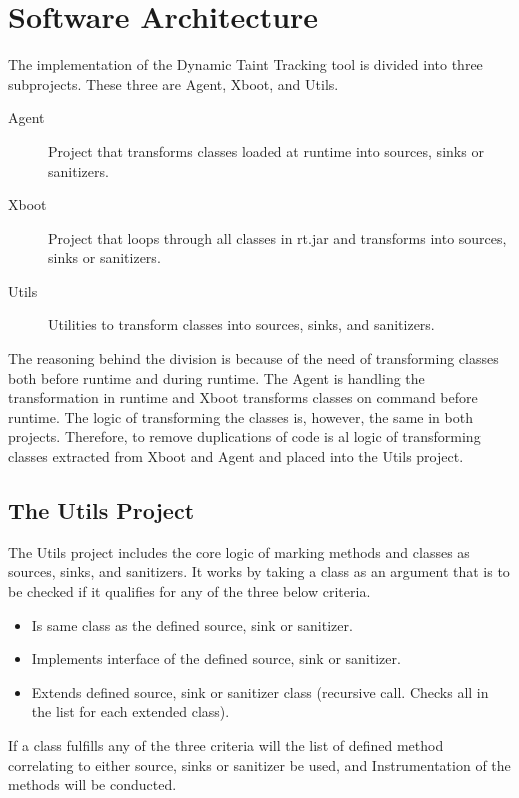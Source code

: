\section{Software Architecture}
\label{SoftwareArchitecture}
The implementation of the Dynamic Taint Tracking tool is divided into three subprojects. These three are Agent, Xboot, and Utils. 

\hfill
\begin{description}
    \item[Agent] Project that transforms classes loaded at runtime into sources, sinks or sanitizers.
    \item[Xboot] Project that loops through all classes in rt.jar and transforms into sources, sinks or sanitizers.
    \item[Utils] Utilities to transform classes into sources, sinks, and sanitizers. 
\end{description}
\hfill

The reasoning behind the division is because of the need of transforming classes both before runtime and during runtime. The Agent is handling the transformation in runtime and Xboot transforms classes on command before runtime. The logic of transforming the classes is, however, the same in both projects. Therefore, to remove duplications of code is al logic of transforming classes extracted from Xboot and Agent and placed into the Utils project.



\subsection{The Utils Project}
The Utils project includes the core logic of marking methods and classes as sources, sinks, and sanitizers. It works by taking a class as an argument that is to be checked if it qualifies for any of the three below criteria.

\hfill
\begin{itemize}
    \item Is same class as the defined source, sink or sanitizer.
    \item Implements interface of the defined source, sink or sanitizer.
    \item Extends defined source, sink or sanitizer class (recursive call. Checks all in the list for each extended class). 
\end{itemize}
\hfill

If a class fulfills any of the three criteria will the list of defined method correlating to either source, sinks or sanitizer be used, and Instrumentation of the methods will be conducted.

